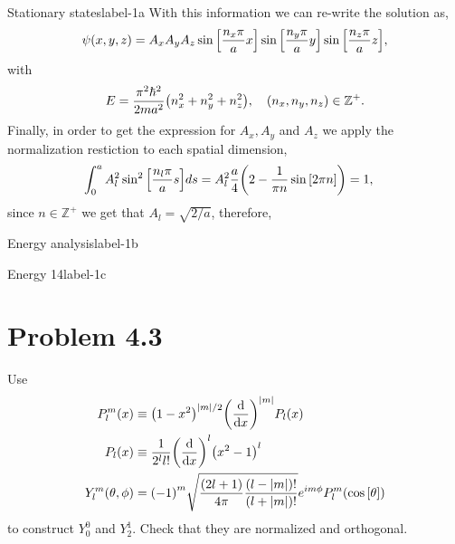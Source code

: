 \documentclass[../main.tex]{subfiles}
\begin{document}
\begin{sol}{Stationary states}{label-1a}
    With this information we can re-write the solution as,
    \begin{gather*}
        \psi\qty(x,y,z)=A_x A_y A_z\sin\qty[\frac{n_x\pi}{a} x]\sin\qty[\frac{n_y\pi}{a} y]\sin\qty[\frac{n_z\pi}{a} z],
    \end{gather*} 
    with
    \begin{gather*}
        E=\frac{\pi^2\hbar^2}{2ma^2}\qty(n_x^2+n_y^2+n_z^2), \quad \qty(n_x,n_y,n_z)\in\mathbb{Z}^+.
    \end{gather*}
    Finally, in order to get the expression for $A_x,A_y$ and $A_z$ we apply the normalization restiction to each spatial dimension,
    \begin{align*}
        \int_0^a A_l^2\sin^2\qty[\frac{n_l\pi}{a} s] ds &= A^2_l\frac{a}{4}\qty(2-\frac{1}{\pi n}\sin\qty[2\pi n]) = 1,
    \end{align*}
    since $n\in\mathbb{Z}^+$ we get that $A_l=\sqrt{2/a}$, therefore,
\end{sol}


\begin{sol}{Energy analysis}{label-1b}

\end{sol}

\begin{sol}{Energy 14}{label-1c}

\end{sol}


\section{Problem 4.3}

Use 
\begin{align*}
    P^m_l(x)&\equiv\qty(1-x^2)^{\abs{m}/2}\qty(\dv{x})^{\abs{m}}P_l(x) \\
    P_l\qty(x) &\equiv\frac{1}{2^l l!}\qty(\dv{x})^l\qty(x^2-1)^l \\
    Y^m_l\qty(\theta,\phi) &=\qty(-1)^{m}\sqrt{\frac{\qty(2l+1)}{4\pi}\frac{\qty(l-\abs{m})!}{\qty(l+\abs{m})!}}e^{im\phi}P^m_l\qty(\cos\qty[\theta]) 
\end{align*}
to construct $Y^0_0$ and $Y^1_2$.
Check that they are normalized and orthogonal.
\end{document}
